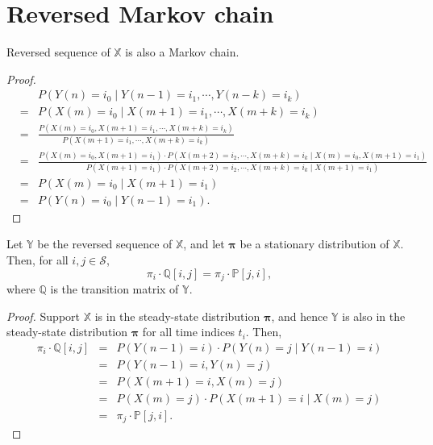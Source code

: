 \section{Reversed Markov chain}

\begin{observation}
Reversed sequence of $ \mathbb{X} $ is also a Markov chain.
\begin{proof}
\begin{eqnarray*}
&   & P(Y(n) = i_{0} \mid Y(n - 1) = i_{1}, \cdots, Y(n - k) = i_{k}) \\
& = & P(X(m) = i_{0} \mid X(m + 1) = i_{1}, \cdots, X(m + k) = i_{k}) \\
& = & \frac{P(X(m) = i_{0}, X(m + 1) = i_{1}, \cdots, X(m + k) = i_{k})}{P(X(m + 1) = i_{1}, \cdots, X(m + k) = i_{k})} \\
& = & \frac{P(X(m) = i_{0}, X(m + 1) = i_{1}) \cdot P(X(m + 2) = i_{2}, \cdots, X(m + k) = i_{k} \mid X(m) = i_{0}, X(m + 1) = i_{1})}{P(X(m + 1) = i_{1}) \cdot P(X(m + 2) = i_{2}, \cdots, X(m + k) = i_{k} \mid X(m + 1) = i_{1})} \\
& = & P(X(m) = i_{0} \mid X(m + 1) = i_{1}) \\
& = & P(Y(n) = i_{0} \mid Y(n - 1) = i_{1}).
\end{eqnarray*}
\end{proof}
\end{observation}

\begin{observation} \label{obs:pi_i-q_ij-eq-pi_j-p_ji}
Let $ \mathbb{Y} $ be the reversed sequence of $ \mathbb{X} $, and let $ \boldsymbol\pi $ be a stationary distribution of $ \mathbb{X} $. Then, for all $ i, j \in \mathcal{S} $,
\[ \pi_{i} \cdot \mathbb{Q}[i, j] = \pi_{j} \cdot \mathbb{P}[j, i], \]
where $ \mathbb{Q} $ is the transition matrix of $ \mathbb{Y} $.
\begin{proof}
Support $ \mathbb{X} $ is in the steady-state distribution $ \boldsymbol\pi $, and hence $ \mathbb{Y} $ is also in the steady-state distribution $ \boldsymbol\pi $ for all time indices $ t_{i} $. Then,
\begin{eqnarray*}
\pi_{i} \cdot \mathbb{Q}[i, j]
  & = & P(Y(n - 1) = i) \cdot P(Y(n) = j \mid Y(n - 1) = i) \\
  & = & P(Y(n - 1) = i, Y(n) = j) \\
  & = & P(X(m + 1) = i, X(m) = j) \\
  & = & P(X(m) = j) \cdot P(X(m + 1) = i \mid X(m) = j) \\
  & = & \pi_{j} \cdot \mathbb{P}[j, i].
\end{eqnarray*}
\end{proof}
\end{observation}

